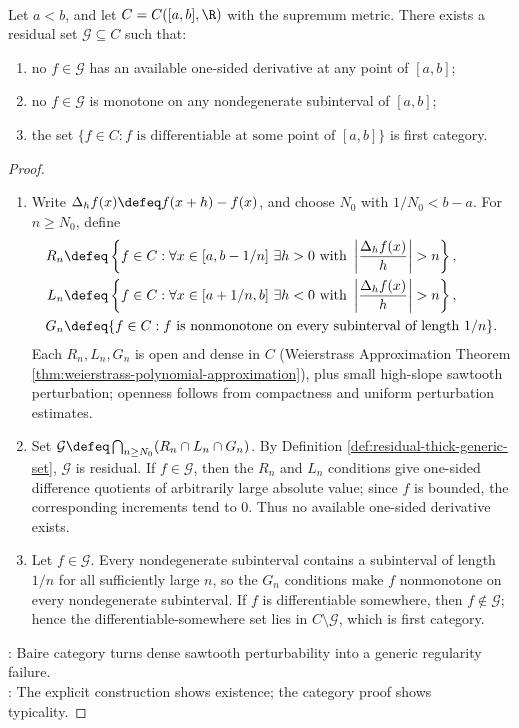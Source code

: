 \begin{theorem} \label{thm:differentiable-somewhere-first-category} \\
Let $a<b$, and let $C=C([a,b],\R)$ with the supremum metric. There exists a residual set $\mathcal{G}\subseteq C$ such that:
\begin{enumerate}[label=(\roman*)]
\setlength{\itemsep}{0pt}
\item no $f\in\mathcal{G}$ has an available one-sided derivative at any point of $[a,b]$;
\item no $f\in\mathcal{G}$ is monotone on any nondegenerate subinterval of $[a,b]$;
\item the set $\{f\in C:f\text{ is differentiable at some point of }[a,b]\}$ is first category.
\end{enumerate}
\begin{proof}
\begin{enumerate}[label=(\roman*)]
\setlength{\itemsep}{0pt}
\item Write $\Delta_hf(x)\defeq f(x+h)-f(x)$, and choose $N_0$ with $1/N_0<b-a$. For $n\geq N_0$, define
\begin{align}
R_n&\defeq\left\{f\in C:\forall x\in[a,b-1/n]\ \exists h>0\text{ with }\left|\frac{\Delta_hf(x)}{h}\right|>n\right\}, \nonumber\\
L_n&\defeq\left\{f\in C:\forall x\in[a+1/n,b]\ \exists h<0\text{ with }\left|\frac{\Delta_hf(x)}{h}\right|>n\right\}, \nonumber\\
G_n&\defeq\{f\in C:f\text{ is nonmonotone on every subinterval of length }1/n\}. \nonumber
\end{align}
Each $R_n,L_n,G_n$ is open and dense in $C$ (Weierstrass Approximation Theorem \ref{thm:weierstrass-polynomial-approximation}), plus small high-slope sawtooth perturbation; openness follows from compactness and uniform perturbation estimates.
\item Set $\mathcal{G}\defeq\bigcap_{n\geq N_0}(R_n\cap L_n\cap G_n)$. By Definition \ref{def:residual-thick-generic-set}, $\mathcal{G}$ is residual. If $f\in\mathcal{G}$, then the $R_n$ and $L_n$ conditions give one-sided difference quotients of arbitrarily large absolute value; since $f$ is bounded, the corresponding increments tend to $0$. Thus no available one-sided derivative exists.
\item Let $f\in\mathcal{G}$. Every nondegenerate subinterval contains a subinterval of length $1/n$ for all sufficiently large $n$, so the $G_n$ conditions make $f$ nonmonotone on every nondegenerate subinterval. If $f$ is differentiable somewhere, then $f\notin\mathcal{G}$; hence the differentiable-somewhere set lies in $C\setminus\mathcal{G}$, which is first category.
\end{enumerate}
: Baire category turns dense sawtooth perturbability into a generic regularity failure.\\
: The explicit construction shows existence; the category proof shows typicality.
\end{proof}
\end{theorem}

